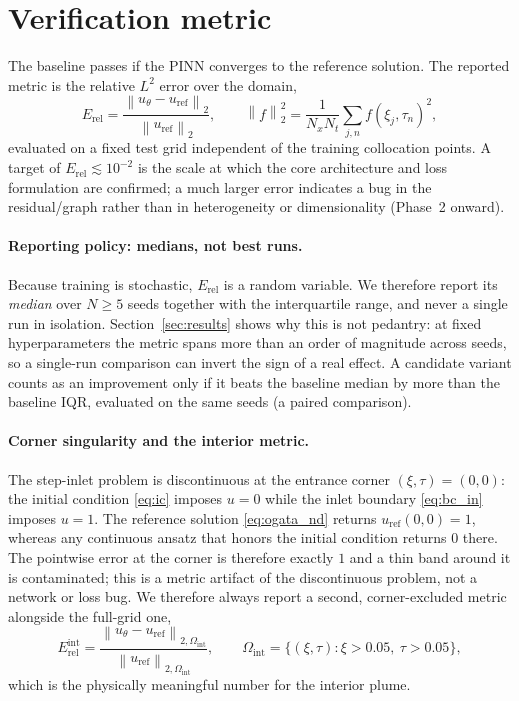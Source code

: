 \documentclass[11pt]{article}
\newcommand{\norm}[1]{\left\lVert #1 \right\rVert}
\begin{document}
\section{Verification metric}
\label{sec:verification}

The baseline passes if the PINN converges to the reference solution. The
reported metric is the relative $L^2$ error over the domain,
\begin{equation}
\label{eq:metric}
E_{\mathrm{rel}}
=\frac{\norm{u_\theta-u_{\mathrm{ref}}}_{2}}{\norm{u_{\mathrm{ref}}}_{2}},
\qquad
\norm{f}_{2}^{2}=\frac{1}{N_x N_t}
\sum_{j,n} f(\xi_j,\tau_n)^{2},
\end{equation}
evaluated on a fixed test grid independent of the training collocation points.
A target of $E_{\mathrm{rel}}\lesssim 10^{-2}$ is the scale at which the core
architecture and loss formulation are confirmed; a much larger error indicates
a bug in the residual/graph rather than in heterogeneity or dimensionality
(Phase~2 onward).

\paragraph{Reporting policy: medians, not best runs.}
Because training is stochastic, $E_{\mathrm{rel}}$ is a random variable. We
therefore report its \emph{median} over $N\geq5$ seeds together with the
interquartile range, and never a single run in isolation. Section~\ref{sec:results}
shows why this is not pedantry: at fixed hyperparameters the metric spans more
than an order of magnitude across seeds, so a single-run comparison can invert
the sign of a real effect. A candidate variant counts as an improvement only if
it beats the baseline median by more than the baseline IQR, evaluated on the
same seeds (a paired comparison).

\paragraph{Corner singularity and the interior metric.}
The step-inlet problem is discontinuous at the entrance corner
$(\xi,\tau)=(0,0)$: the initial condition \eqref{eq:ic} imposes $u=0$ while the
inlet boundary \eqref{eq:bc_in} imposes $u=1$. The reference solution
\eqref{eq:ogata_nd} returns $u_{\mathrm{ref}}(0,0)=1$, whereas any continuous
ansatz that honors the initial condition returns $0$ there. The pointwise error
at the corner is therefore exactly $1$ and a thin band around it is
contaminated; this is a metric artifact of the discontinuous problem, not a
network or loss bug. We therefore always report a second, corner-excluded
metric alongside the full-grid one,
\begin{equation}
\label{eq:metric_int}
E_{\mathrm{rel}}^{\mathrm{int}}
=\frac{\norm{u_\theta-u_{\mathrm{ref}}}_{2,\Omega_{\mathrm{int}}}}
       {\norm{u_{\mathrm{ref}}}_{2,\Omega_{\mathrm{int}}}},\qquad
\Omega_{\mathrm{int}}=\{(\xi,\tau): \xi>0.05,\ \tau>0.05\},
\end{equation}
which is the physically meaningful number for the interior plume.
\end{document}
